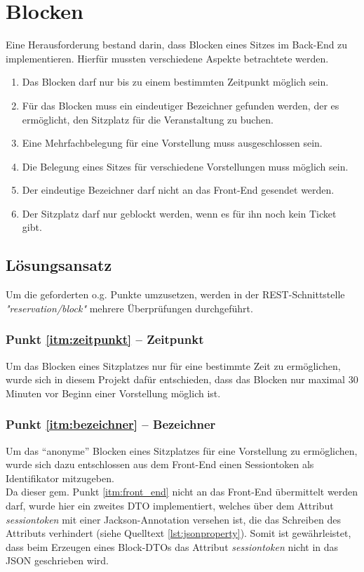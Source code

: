 \section{Blocken}
\label{sec:blocken}
Eine Herausforderung bestand darin, dass Blocken eines Sitzes im Back-End zu implementieren. Hierfür mussten verschiedene Aspekte betrachtete werden.

\begin{enumerate}
\item \label{itm:zeitpunkt}Das Blocken darf nur bis zu einem bestimmten Zeitpunkt möglich sein.
\item \label{itm:bezeichner}Für das Blocken muss ein eindeutiger Bezeichner gefunden werden, der es ermöglicht, den Sitzplatz für die Veranstaltung zu buchen.
\item \label{itm:mehr_eine_vorstellung}Eine Mehrfachbelegung für eine Vorstellung muss ausgeschlossen sein.
\item \label{itm:mehr_mehrere_vorstellungen}Die Belegung eines Sitzes für verschiedene Vorstellungen muss möglich sein.
\item \label{itm:front_end} Der eindeutige Bezeichner darf nicht an das Front-End gesendet werden.
\item \label{itm:ticket} Der Sitzplatz darf nur geblockt werden, wenn es für ihn noch kein Ticket gibt.
\end{enumerate}

\subsection{Lösungsansatz}
\label{ssec:loesung_blocken}
Um die geforderten o.g. Punkte umzusetzen, werden in der \acs{REST}-Schnittstelle \textit{"reservation/block"} mehrere Überprüfungen durchgeführt.
  
\subsubsection*{Punkt \ref{itm:zeitpunkt} -- Zeitpunkt}
\label{ssssec:Zeitpunkt}
Um das Blocken eines Sitzplatzes nur für eine bestimmte Zeit zu ermöglichen, wurde sich in diesem Projekt dafür entschieden, dass das Blocken nur maximal 30 Minuten vor Beginn einer Vorstellung möglich ist. 

\subsubsection*{Punkt \ref{itm:bezeichner} -- Bezeichner}
\label{ssssec:Bezeichner}
Um das \enquote{anonyme} Blocken eines Sitzplatzes für eine Vorstellung zu ermöglichen, wurde sich dazu entschlossen aus dem Front-End einen Sessiontoken als Identifikator mitzugeben. \\
Da dieser gem. Punkt \ref{itm:front_end} nicht an das Front-End übermittelt werden darf, wurde hier ein zweites \acs{DTO} implementiert, welches über dem Attribut \textit{sessiontoken} mit einer Jackson-Annotation 
versehen ist, die das Schreiben des Attributs verhindert (siehe Quelltext \vref{lst:jsonproperty}). Somit ist gewährleistet, dass beim Erzeugen eines Block-\acp{DTO} das Attribut \textit{sessiontoken} nicht in das \acs{JSON} geschrieben wird.

